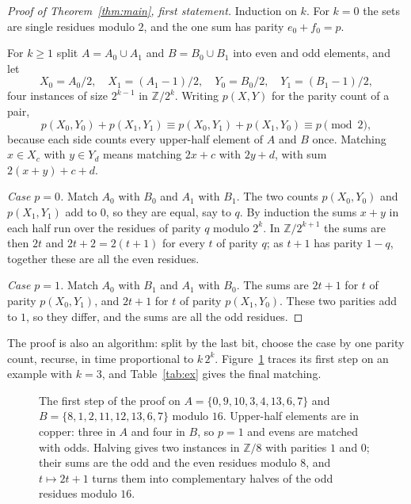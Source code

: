 \documentclass[11pt]{amsart}
\theoremstyle{remark}
\begin{document}
\begin{proof}[Proof of Theorem~\ref{thm:main}, first statement]
Induction on $k$. For $k=0$ the sets are single residues modulo $2$, and the one sum has parity $e_0+f_0=p$.

For $k\ge1$ split $A=A_0\cup A_1$ and $B=B_0\cup B_1$ into even and odd elements, and let
\[
X_0=A_0/2,\quad X_1=(A_1-1)/2,\quad Y_0=B_0/2,\quad Y_1=(B_1-1)/2,
\]
four instances of size $2^{k-1}$ in $\mathbb Z/2^k$. Writing $p(X,Y)$ for the parity count of a pair,
\[
p(X_0,Y_0)+p(X_1,Y_1)\equiv p(X_0,Y_1)+p(X_1,Y_0)\equiv p\pmod2,
\]
because each side counts every upper-half element of $A$ and $B$ once. Matching $x\in X_c$ with $y\in Y_d$ means matching $2x+c$ with $2y+d$, with sum $2(x+y)+c+d$.

\emph{Case $p=0$.} Match $A_0$ with $B_0$ and $A_1$ with $B_1$. The two counts $p(X_0,Y_0)$ and $p(X_1,Y_1)$ add to $0$, so they are equal, say to $q$. By induction the sums $x+y$ in each half run over the residues of parity $q$ modulo $2^k$. In $\mathbb Z/2^{k+1}$ the sums are then $2t$ and $2t+2=2(t+1)$ for every $t$ of parity $q$; as $t+1$ has parity $1-q$, together these are all the even residues.

\emph{Case $p=1$.} Match $A_0$ with $B_1$ and $A_1$ with $B_0$. The sums are $2t+1$ for $t$ of parity $p(X_0,Y_1)$, and $2t+1$ for $t$ of parity $p(X_1,Y_0)$. These two parities add to $1$, so they differ, and the sums are all the odd residues.
\end{proof}

The proof is also an algorithm: split by the last bit, choose the case by one parity count, recurse, in time proportional to $k\,2^k$. Figure~\ref{fig:halving} traces its first step on an example with $k=3$, and Table~\ref{tab:ex} gives the final matching.

\begin{figure}[ht]
\centering
\begin{tikzpicture}
  
\end{tikzpicture}
\caption{The first step of the proof on $A=\{0,9,10,3,4,13,6,7\}$ and $B=\{8,1,2,11,12,13,6,7\}$ modulo $16$. Upper-half elements are in copper: three in $A$ and four in $B$, so $p=1$ and evens are matched with odds. Halving gives two instances in $\mathbb Z/8$ with parities $1$ and $0$; their sums are the odd and the even residues modulo $8$, and $t\mapsto2t+1$ turns them into complementary halves of the odd residues modulo $16$.}
\label{fig:halving}
\end{figure}
\end{document}
